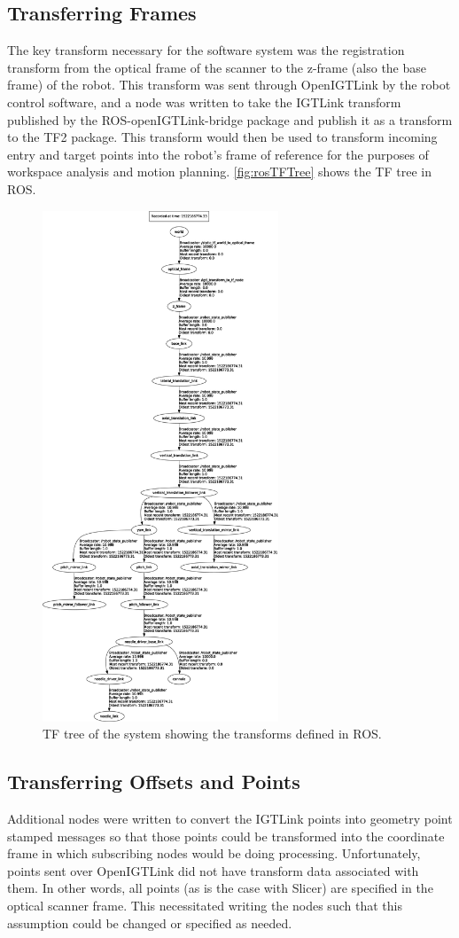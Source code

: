 \documentclass[12pt]{report}
\begin{document}
\subsection{Transferring Frames}
The key transform necessary for the software system was the registration transform from the optical frame of the scanner to the z-frame (also the base frame) of the robot. This transform was sent through OpenIGTLink by the robot control software, and a node was written to take the IGTLink transform published by the ROS-openIGTLink-bridge package and publish it as a transform to the TF2 package. This transform would then be used to transform incoming entry and target points into the robot's frame of reference for the purposes of workspace analysis and motion planning. \autoref{fig:rosTFTree} shows the TF tree in ROS.

\begin{figure}[thpb]
	\centering
	\includegraphics[height=6in]{diagrams/neuro_tf_frames_clipped.pdf}
    \caption{TF tree of the system showing the transforms defined in ROS. }
    \label{fig:rosTFTree}
\end{figure}

\subsection{Transferring Offsets and Points}
Additional nodes were written to convert the IGTLink points into geometry point stamped messages so that those points could be transformed into the coordinate frame in which subscribing nodes would be doing processing. Unfortunately, points sent over OpenIGTLink did not have transform data associated with them. In other words, all points (as is the case with Slicer) are specified in the optical scanner frame. This necessitated writing the nodes such that this assumption could be changed or specified as needed.
\end{document}
